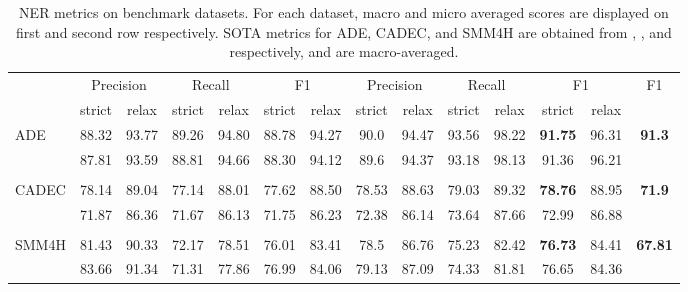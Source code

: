 \documentclass[letterpaper]{article}
\begin{document}
\begin{itemize}
\begin{table*}
{\begin{tabular}{ lccccccccccccc}
\multirow{2}{*}{} &\multicolumn{2}{c}{Precision} &\multicolumn{2}{c}{Recall} &\multicolumn{2}{c}{F1} &\multicolumn{2}{c}{Precision} &\multicolumn{2}{c}{Recall} &\multicolumn{2}{c}{F1} & F1 \\

\multicolumn{1}{c}{} & \multicolumn{1}{c}{strict} & \multicolumn{1}{c}{relax} & \multicolumn{1}{c}{strict} & \multicolumn{1}{c}{relax}& \multicolumn{1}{c}{strict} & \multicolumn{1}{c}{relax} & \multicolumn{1}{c}{strict} & \multicolumn{1}{c}{relax} & \multicolumn{1}{c}{strict} & \multicolumn{1}{c}{relax}& \multicolumn{1}{c}{strict} & \multicolumn{1}{c}{relax} \\
\midrule
\multirow{2}{*}{ADE} & 88.32 & 93.77 & 89.26 & 94.80 & 88.78 & 94.27 & 90.0 & 94.47 & 93.56 & 98.22 & \textbf{91.75} & 96.31 & \textbf{91.3}\\
 & 87.81 & 93.59 & 88.81 & 94.66 & 88.30 & 94.12 & 89.6 & 94.37 & 93.18 & 98.13 & 91.36 & 96.21 \\
 & & & & & & & & & & & & \\
\multirow{2}{*}{CADEC} & 78.14 & 89.04 & 77.14 & 88.01 & 77.62 & 88.50 & 78.53 & 88.63 & 79.03 & 89.32 & \textbf{78.76} & 88.95 & \textbf{71.9}\\
 & 71.87 & 86.36 & 71.67 & 86.13 & 71.75 & 86.23 & 72.38 & 86.14 & 73.64 & 87.66 & 72.99 & 86.88  \\
 & & & & & & & & & & & & \\
 \multirow{2}{*}{SMM4H} & 81.43 & 90.33 & 72.17 & 78.51 & 76.01 & 83.41 & 78.5 & 86.76 & 75.23 & 82.42 & \textbf{76.73} & 84.41 & \textbf{67.81}\\
 & 83.66 & 91.34 & 71.31 & 77.86 & 76.99 & 84.06 & 79.13 & 87.09 & 74.33 & 81.81 & 76.65 & 84.36\\
\bottomrule
\end{tabular}}
\caption{NER metrics on benchmark datasets. For each dataset, macro and micro averaged scores are displayed on first and second row respectively. SOTA metrics for ADE, CADEC, and SMM4H are obtained from \cite{yan2021partition}, \cite{stanovsky-etal-2017-recognizing}, and \cite{DBLP:journals/corr/abs-2003-09288} respectively, and are macro-averaged.}
\label{tab:ner_metrics}
\end{table*}


\end{itemize}
\end{document}
